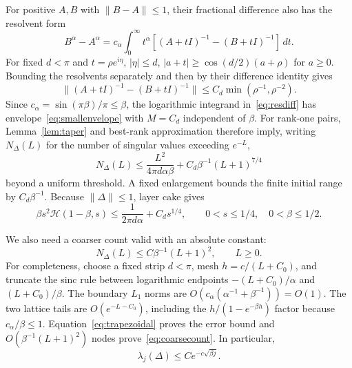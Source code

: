 \documentclass[11pt]{article}
\numberwithin{equation}{section}
\newcommand{\cH}{\mathcal H}
\begin{document}
For positive $A,B$ with $\|B-A\|\le1$, their fractional difference
also has the resolvent form
\begin{equation}\label{eq:resdiff}
 B^\alpha-A^\alpha=c_\alpha\int_0^\infty
              t^\alpha[(A+tI)^{-1}-(B+tI)^{-1}]\,dt.
\end{equation}
For fixed $d<\pi$ and $t=\rho e^{i\eta}$, $|\eta|\le d$,
$|a+t|\ge\cos(d/2)(a+\rho)$ for $a\ge0$. Bounding the resolvents
separately and then by their difference identity gives
\[
 \|(A+tI)^{-1}-(B+tI)^{-1}\|
              \le C_d\min(\rho^{-1},\rho^{-2}).
\]
Since $c_\alpha=\sin(\pi\beta)/\pi\le\beta$, the logarithmic
integrand in~\eqref{eq:resdiff} has envelope~\eqref{eq:smallenvelope}
with $M=C_d$ independent of $\beta$.
For rank-one pairs, Lemma~\ref{lem:taper} and best-rank approximation
therefore imply, writing $N_\Delta(L)$ for the number of singular
values exceeding $e^{-L}$,
\begin{equation}\label{eq:uniformcount}
 N_\Delta(L)\le\frac{L^2}{4\pi d\alpha\beta}
                    +C_d\beta^{-1}(L+1)^{7/4}
\end{equation}
beyond a uniform threshold. A fixed enlargement bounds the finite
initial range by $C_d\beta^{-1}$. Because $\|\Delta\|\le1$, layer cake
gives
\begin{equation}\label{eq:gaussianupper}
 \beta s^2\cH(1-\beta,s)
       \le\frac1{2\pi d\alpha}+C_d s^{1/4},
 \qquad 0<s\le1/4,\quad0<\beta\le1/2.
\end{equation}

We also need a coarser count valid with an absolute constant:
\begin{equation}\label{eq:coarsecount}
 N_\Delta(L)\le C\beta^{-1}(L+1)^2,\qquad L\ge0.
\end{equation}
For completeness, choose a fixed strip $d<\pi$, mesh
$h=c/(L+C_0)$, and truncate the sinc rule between logarithmic
endpoints $-(L+C_0)/\alpha$ and $(L+C_0)/\beta$.
The boundary $L_1$ norms are
$O(c_\alpha(\alpha^{-1}+\beta^{-1}))=O(1)$.
The two lattice tails are $O(e^{-L-C_0})$, including the
$h/(1-e^{-\beta h})$ factor because $c_\alpha/\beta\le1$.
Equation~\eqref{eq:trapezoidal} proves the error bound and
$O(\beta^{-1}(L+1)^2)$ nodes prove~\eqref{eq:coarsecount}.
In particular,
\begin{equation}\label{eq:coarseeigen}
 \lambda_j(\Delta)\le C e^{-c\sqrt{\beta j}}.
\end{equation}
\end{document}
